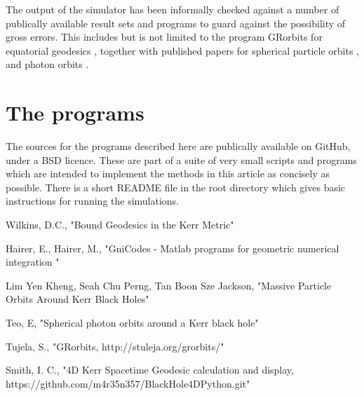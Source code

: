 \documentclass[11pt]{article}
\begin{document}
The output of the simulator has been informally checked against a number of publically available result sets and programs to guard against the possibility of gross errors.  This includes  but is not limited to the program GRorbits for equatorial geodesics \cite{grorbits}, together with published papers for spherical particle orbits \cite{teo}, and photon orbits \cite{kheng}.

\section{The programs}

The sources for the programs \cite{m4r35n357} described here are publically available on GitHub, under a BSD licence.  These are part of a suite of very small scripts and programs which are intended to implement the methods in this article as concisely as possible.  There is a short README file in the root directory which gives basic instructions for running the simulations.

\begin{thebibliography}{1}

   Wilkins, D.C., "Bound Geodesics in the Kerr Metric"

    Hairer, E., Hairer, M., "GniCodes - Matlab programs for geometric numerical integration "

   Lim Yen Kheng, Seah Chu Perng, Tan Boon Sze Jackson, "Massive Particle Orbits Around Kerr Black Holes"

   Teo, E, "Spherical photon orbits around a Kerr black hole"
  
   Tujela, S., "GRorbits, http://stuleja.org/grorbits/"
  
   Smith, I. C., "4D Kerr Spacetime Geodesic calculation and display, https://github.com/m4r35n357/BlackHole4DPython.git"

\end{thebibliography}
\end{document}
